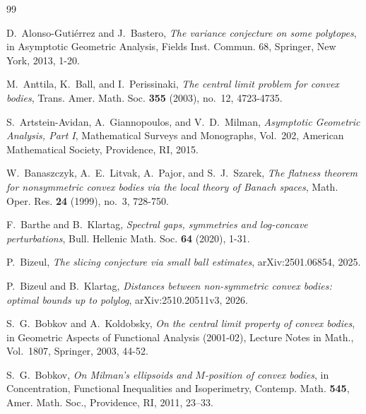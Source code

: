 \documentclass[12pt]{article}
\theoremstyle{definition}
\theoremstyle{remark}
\begin{document}
\begin{thebibliography}{99}

D.~Alonso-Guti\'errez and J.~Bastero,
\emph{The variance conjecture on some polytopes},
in Asymptotic Geometric Analysis, Fields Inst. Commun. 68,
Springer, New York, 2013, 1-20.

M.~Anttila, K.~Ball, and I.~Perissinaki,
\emph{The central limit problem for convex bodies},
Trans. Amer. Math. Soc. \textbf{355} (2003), no.~12, 4723-4735.

S.~Artstein-Avidan, A.~Giannopoulos, and V.~D.~Milman,
\emph{Asymptotic Geometric Analysis, Part I},
Mathematical Surveys and Monographs, Vol.~202,
American Mathematical Society, Providence, RI, 2015.


W.~Banaszczyk, A.~E.~Litvak, A.~Pajor, and S.~J.~Szarek,
\emph{The flatness theorem for nonsymmetric convex bodies via the local theory of Banach spaces},
Math. Oper. Res. \textbf{24} (1999), no.~3, 728-750.

F.~Barthe and B.~Klartag,
\emph{Spectral gaps, symmetries and log-concave perturbations},
Bull. Hellenic Math. Soc. \textbf{64} (2020), 1-31.

P.~Bizeul,
\emph{The slicing conjecture via small ball estimates},
arXiv:2501.06854, 2025.

P.~Bizeul and B.~Klartag,
\emph{Distances between non-symmetric convex bodies: optimal bounds up to polylog},
arXiv:2510.20511v3, 2026.

S.~G.~Bobkov and A.~Koldobsky,
\emph{On the central limit property of convex bodies},
in Geometric Aspects of Functional Analysis (2001-02),
Lecture Notes in Math., Vol.~1807, Springer, 2003, 44-52.


S.~G.~Bobkov,
\emph{On Milman's ellipsoids and $M$-position of convex bodies},
in Concentration, Functional Inequalities and Isoperimetry,
Contemp. Math. \textbf{545}, Amer. Math. Soc., Providence, RI, 2011,
23--33.


\end{thebibliography}
\end{document}
